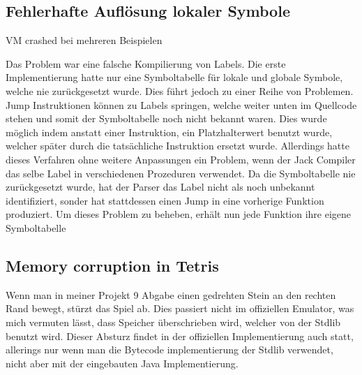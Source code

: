 \subsection{Fehlerhafte Auflösung lokaler Symbole}
VM crashed bei mehreren Beispielen

Das Problem war eine falsche Kompilierung von Labels. Die erste Implementierung hatte nur eine Symboltabelle für lokale und globale Symbole, welche nie zurückgesetzt wurde. Dies führt jedoch zu einer Reihe von Problemen.
Jump Instruktionen können zu Labels springen, welche weiter unten im Quellcode stehen und somit der Symboltabelle noch nicht bekannt waren. Dies wurde möglich indem anstatt einer Instruktion, ein Platzhalterwert benutzt wurde, welcher später durch die tatsächliche Instruktion ersetzt wurde.
Allerdings hatte dieses Verfahren ohne weitere Anpassungen ein Problem, wenn der Jack Compiler das selbe Label in verschiedenen Prozeduren verwendet. Da die Symboltabelle nie zurückgesetzt wurde, hat der Parser das Label nicht als noch unbekannt identifiziert, sonder hat stattdessen einen Jump in eine vorherige Funktion produziert.
Um dieses Problem zu beheben, erhält nun jede Funktion ihre eigene Symboltabelle


\subsection{Memory corruption in Tetris}
Wenn man in meiner Projekt 9 Abgabe einen gedrehten Stein an den rechten Rand bewegt, stürzt das Spiel ab. Dies passiert nicht im offiziellen Emulator, was mich vermuten lässt, dass Speicher überschrieben wird, welcher von der Stdlib benutzt wird. Dieser Absturz findet in der offiziellen Implementierung auch statt, allerings nur wenn man die Bytecode implementierung der Stdlib verwendet, nicht aber mit der eingebauten Java Implementierung.
